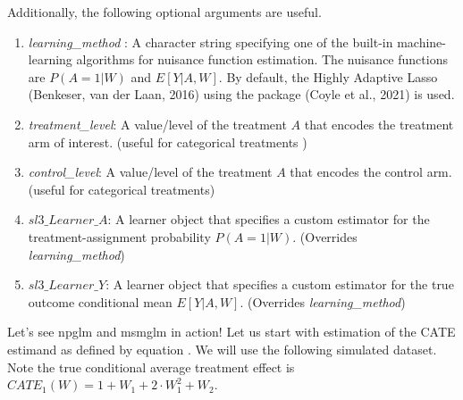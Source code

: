 \documentclass[
]{jss}
\begin{document}
Additionally, the following optional arguments are useful.

\begin{enumerate}
\item \textit{learning\_method} : A character string specifying one of the built-in machine-learning algorithms for nuisance function estimation. The nuisance functions are $P(A=1|W)$ and $E[Y|A,W]$. By default, the Highly Adaptive Lasso (Benkeser, van der Laan, 2016) using the package  (Coyle et al., 2021) is used.
\item \textit{treatment\_level}: A value/level of the treatment $A$ that encodes the treatment arm of interest. (useful for categorical treatments )
\item \textit{control\_level}: A value/level of the treatment $A$ that encodes the control arm. (useful for categorical treatments)
\item $sl3\_Learner\_A$: A  learner object that specifies a custom estimator for the treatment-assignment probability $P(A=1|W)$. (Overrides \textit{learning\_method})
\item $sl3\_Learner\_Y$: A  learner object that specifies a custom estimator for the true outcome conditional mean $E[Y|A,W]$. (Overrides \textit{learning\_method})
\end{enumerate}

Let's see npglm and msmglm in action! Let us start with estimation of
the CATE estimand as defined by equation \label{eqn::estimandNPCATE}. We
will use the following simulated dataset. Note the true conditional
average treatment effect is
\(CATE_1(W) = 1 + W_1 + 2 \cdot W_1^2 + W_2\).
\end{document}
